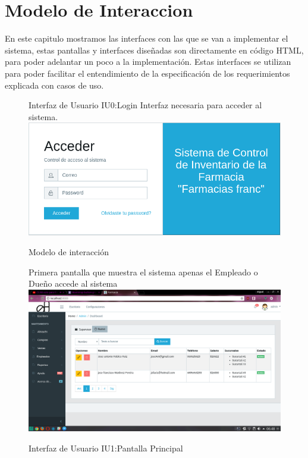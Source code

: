 \chapter{Modelo de Interaccion}
 
En este capitulo mostramos las interfaces con las que se van a implementar el sistema, estas pantallas y interfaces diseñadas son directamente en código HTML, para poder adelantar un poco a la implementación. 
Estas interfaces se utilizan para poder facilitar el entendimiento de la especificación de los requerimientos explicada con casos de uso.


\begin{figure}[htbp!]
	\begin{center}
	Interfaz de Usuario IU0:Login
	Interfaz necesaria para acceder al sistema.
		\includegraphics[width=\textwidth]{Pantallas/login}
		\caption{Modelo de interacción}
	\end{center}
\end{figure}



\begin{figure}[htbp!]
	\begin{center}
	
Primera pantalla que muestra el sistema apenas el Empleado o Dueño accede al sistema
		\includegraphics[width=\textwidth]{Pantallas/PantallaPrincipal}
		\caption{Interfaz de Usuario IU1:Pantalla Principal}
	\end{center}
\end{figure}






